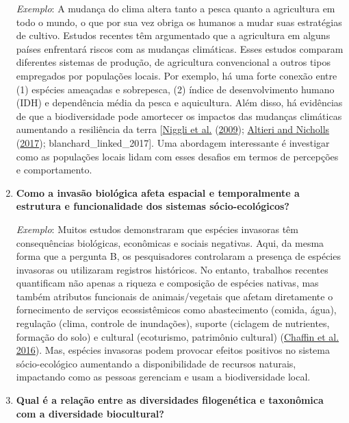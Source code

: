 \documentclass[
]{article}
\begin{document}
\begin{enumerate}
  \emph{Exemplo}: A mudança do clima altera tanto a pesca quanto a agricultura em todo o mundo, o que por sua vez obriga os humanos a mudar suas estratégias de cultivo. Estudos recentes têm argumentado que a agricultura em alguns países enfrentará riscos com as mudanças climáticas. Esses estudos comparam diferentes sistemas de produção, de agricultura convencional a outros tipos empregados por populações locais. Por exemplo, há uma forte conexão entre (1) espécies ameaçadas e sobrepesca, (2) índice de desenvolvimento humano (IDH) e dependência média da pesca e aquicultura. Além disso, há evidências de que a biodiversidade pode amortecer os impactos das mudanças climáticas aumentando a resiliência da terra {[}\protect\hyperlink{ref-niggli_low_2009}{Niggli et al.} (\protect\hyperlink{ref-niggli_low_2009}{2009}); \protect\hyperlink{ref-altieri_adaptation_2017}{Altieri and Nicholls} (\protect\hyperlink{ref-altieri_adaptation_2017}{2017}); blanchard\_linked\_2017{]}. Uma abordagem interessante é investigar como as populações locais lidam com esses desafios em termos de percepções e comportamento.
\item
  \textbf{Como a invasão biológica afeta espacial e temporalmente a estrutura e funcionalidade dos sistemas sócio-ecológicos?}

  \emph{Exemplo}: Muitos estudos demonstraram que espécies invasoras têm consequências biológicas, econômicas e sociais negativas. Aqui, da mesma forma que a pergunta B, os pesquisadores controlaram a presença de espécies invasoras ou utilizaram registros históricos. No entanto, trabalhos recentes quantificam não apenas a riqueza e composição de espécies nativas, mas também atributos funcionais de animais/vegetais que afetam diretamente o fornecimento de serviços ecossistêmicos como abastecimento (comida, água), regulação (clima, controle de inundações), suporte (ciclagem de nutrientes, formação do solo) e cultural (ecoturismo, patrimônio cultural) (\protect\hyperlink{ref-chaffin_biological_2016}{Chaffin et al. 2016}). Mas, espécies invasoras podem provocar efeitos positivos no sistema sócio-ecológico aumentando a disponibilidade de recursos naturais, impactando como as pessoas gerenciam e usam a biodiversidade local.
\item
  \textbf{Qual é a relação entre as diversidades filogenética e taxonômica com a diversidade biocultural?}


\end{enumerate}
\end{document}
